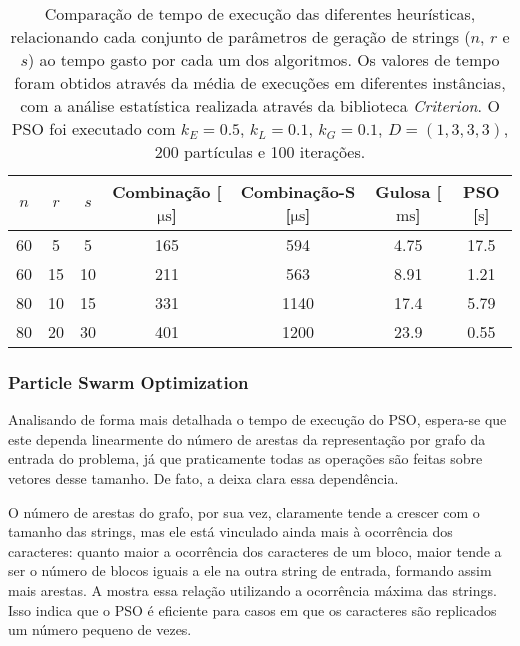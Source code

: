     \begin{table}[htb]
        \centering
        \begin{tabular}{ccc|cccc}
            \toprule
            $n$ & $r$ & $s$ & Combinação [$\unit{\micro\second}$] & Combinação-S [$\unit{\micro\second}$] & Gulosa [$\unit{\milli\second}$] & PSO [$\unit{\second}$] \\
            \midrule
            60 &  5 &  5 & 165 & 594  & 4.75 & 17.5 \\
            60 & 15 & 10 & 211 & 563  & 8.91 & 1.21 \\
            80 & 10 & 15 & 331 & 1140 & 17.4 & 5.79 \\
            80 & 20 & 30 & 401 & 1200 & 23.9 & 0.55 \\
            \bottomrule
        \end{tabular}

        \caption{Comparação de tempo de execução das diferentes heurísticas, relacionando cada conjunto de parâmetros de geração de strings ($n$, $r$ e $s$) ao tempo gasto por cada um dos algoritmos. Os valores de tempo foram obtidos através da média de execuções em diferentes instâncias, com a análise estatística realizada através da biblioteca \textit{Criterion}\protect\footnotemark. O PSO foi executado com $k_E = 0.5$, $k_L = 0.1$, $k_G = 0.1$, $D = (1, 3, 3, 3)$, 200 partículas e 100 iterações.}
        \label{tab:bench-tempo}
    \end{table}


    \subsubsection{Particle Swarm Optimization} \label{sec:tempo-pso}

        Analisando de forma mais detalhada o tempo de execução do PSO, espera-se que este dependa linearmente do número de arestas da representação por grafo da entrada do problema, já que praticamente todas as operações são feitas sobre vetores desse tamanho. De fato, a  deixa clara essa dependência.

        O número de arestas do grafo, por sua vez, claramente tende a crescer com o tamanho das strings, mas ele está vinculado ainda mais à ocorrência dos caracteres: quanto maior a ocorrência dos caracteres de um bloco, maior tende a ser o número de blocos iguais a ele na outra string de entrada, formando assim mais arestas. A  mostra essa relação utilizando a ocorrência máxima das strings. Isso indica que o PSO é eficiente para casos em que os caracteres são replicados um número pequeno de vezes.

